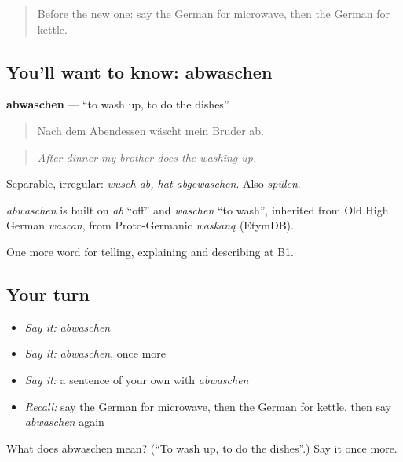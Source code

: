 \begin{quote}
Before the new one: say the German for microwave, then the German for kettle.
\end{quote}

\subsection*{You'll want to know: abwaschen}
\textbf{abwaschen} — \textquotedblleft{}to wash up, to do the dishes\textquotedblright{}.

\begin{quote}
Nach dem Abendessen wäscht mein Bruder ab.
\end{quote}

\begin{quote}
\emph{After dinner my brother does the washing-up.}
\end{quote}

Separable, irregular: \emph{wusch ab, hat abgewaschen}. Also \emph{spülen}.

\begin{cousinweb}
\emph{abwaschen} is built on \emph{ab} \textquotedblleft{}off\textquotedblright{} and \emph{waschen} \textquotedblleft{}to wash\textquotedblright{}, inherited from Old High German \emph{wascan}, from Proto-Germanic \emph{waskaną} (EtymDB).
\end{cousinweb}

\begin{grammarlens}[title={What you've built}]
One more word for telling, explaining and describing at B1.
\end{grammarlens}

\subsection*{Your turn}
\begin{itemize}
\raggedright
  \item \emph{Say it:} \emph{abwaschen}
  \item \emph{Say it:} \emph{abwaschen}, once more
  \item \emph{Say it:} a sentence of your own with \emph{abwaschen}
  \item \emph{Recall:} say the German for microwave, then the German for kettle, then say \emph{abwaschen} again
\end{itemize}

\begin{tcolorbox}[breakable,colback=teal!4,colframe=teal!35!black,title={Before you move on}]
What does abwaschen mean? (\textquotedblleft{}To wash up, to do the dishes\textquotedblright{}.) Say it once more.
\end{tcolorbox}
